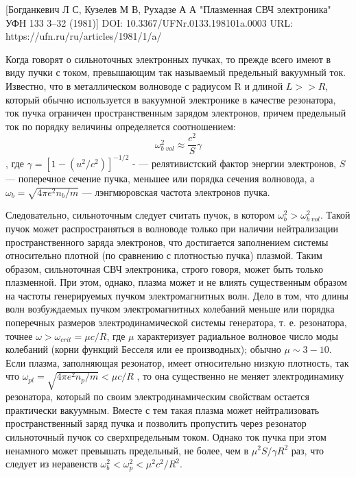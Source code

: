 \documentclass[10pt, a4paper]{article}
\begin{document}
[Богданкевич Л С, Кузелев М В, Рухадзе А А "Плазменная СВЧ электроника" УФН 133 3–32 (1981)]
DOI: 10.3367/UFNr.0133.198101a.0003
URL: https://ufn.ru/ru/articles/1981/1/a/

Когда говорят о сильноточных электронных пучках, то прежде всего имеют в виду пучки с током, превышающим так называемый предельный вакуумный ток. Известно, что в металлическом волноводе с радиусом R и длиной $L >> R$, который обычно используется в вакуумной электронике в качестве резонатора, ток пучка ограничен пространственным зарядом электронов, причем предельный ток по порядку величины определяется соотношением:
\begin{equation}
	\omega_{b \; vol}^{2} \approx \frac{c^{2}}{S} \gamma
\end{equation}
, где $\gamma = [1-(u^{2}/c^{2})]^{-1/2}$ - — релятивистский фактор энергии электронов, $S$ — поперечное сечение пучка, меньшее или порядка сечения волновода, а $\omega_{b}=\sqrt{4\pi e^{2} n_{b} /m}$ — лэнгмюровская частота электронов пучка. 


Следовательно, сильноточным следует считать пучок, в котором $\omega_{b}^{2}>\omega_{b\;vol}^{2}$. Такой пучок может распространяться в волноводе только при наличии нейтрализации пространственного заряда электронов, что достигается заполнением системы относительно плотной (по сравнению с плотностью пучка) плазмой. Таким образом, сильноточная СВЧ электроника, строго говоря, может быть только плазменной. При этом, однако, плазма может и не влиять существенным образом на частоты генерируемых пучком электромагнитных волн. Дело в том, что длины волн возбуждаемых пучком электромагнитных колебаний меньше или порядка поперечных размеров электродинамической системы генератора, т. е. резонатора, точнее $\omega>\omega_{crit}= \mu c/R$, где $\mu$ характеризует радиальное волновое число моды колебаний (корни функций Бесселя или ее производных); обычно $\mu \sim 3-10$. Если плазма, заполняющая резонатор, имеет относительно низкую плотность, так что $\omega_{pl}=\sqrt{4\pi e^{2} n_{p} /m} < \mu c/R$ , то она существенно не меняет электродинамику резонатора, который по своим электродинамическим свойствам остается практически вакуумным. Вместе с тем такая плазма может нейтрализовать пространственный заряд пучка и позволить пропустить через резонатор сильноточный пучок со сверхпредельным током. Однако ток пучка при этом ненамного может превышать предельный, не более, чем в $\mu^{2} S/\gamma R^{2}$ раз, что следует из неравенств $\omega_{b}^{2}<\omega_{p}^{2}<\mu^{2} c^{2}/R^{2}$.
\end{document}
